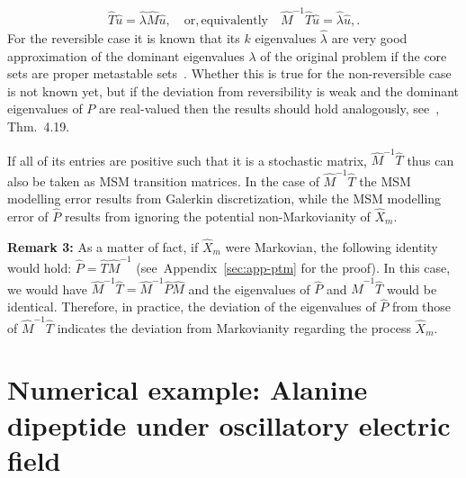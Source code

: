 \documentclass[aps, pre, preprint,unsortedaddress,a4paper,onecolumn]{revtex4}
\begin{document}
\begin{align}
  \label{eq:msm-gen-ev}
\hat{T}\hat{u}=\hat{\lambda}\hat{M}\hat{u},\quad\mathrm{or, equivalently}\quad \hat{M}^{-1}\hat{T}\hat{u}=\hat{\lambda}\hat{u},.  
\end{align}
For the reversible case it is known that its $k$ eigenvalues $\hat{\lambda}$ are very good approximation of the dominant eigenvalues $\lambda$ of the original problem if the core sets are proper metastable sets~\cite{Eigenvalues}. Whether this is true for the non-reversible case is not known yet, but if the deviation from reversibility is weak and the dominant eigenvalues of $P$ are real-valued then the results should hold analogously, see~\cite{A19-31}, Thm.~4.19. 

If all of its entries are positive such that it is a stochastic matrix, $\hat{M}^{-1}\hat{T}$ thus can also be taken as MSM transition matrices. In the case of $\hat{M}^{-1}\hat{T}$ the MSM modelling error results from Galerkin discretization, while the MSM modelling error of $\hat{P}$ results from ignoring the potential non-Markovianity of $\hat{X}_m$.

\textbf{Remark 3:} As a matter of fact, if $\hat X_m$ were Markovian, the following identity would hold: $\hat P = \hat T \hat M^{-1}$ (see~Appendix~\ref{sec:app-ptm} for the proof). In this case, we would have $\hat{M}^{-1}\hat{T}=\hat{M}^{-1}\hat{P}\hat{M}$ and the eigenvalues of $\hat{P}$ and $\hat{M}^{-1}\hat{T}$ would be identical.
Therefore, in practice, the deviation of the eigenvalues of $\hat P$ from those of $\hat{M}^{-1}\hat{T}$ indicates the deviation from Markovianity regarding the process $\hat{X}_m$.





\section{Numerical example:
  Alanine dipeptide under oscillatory electric field}
\label{sec:alanine}
\end{document}

